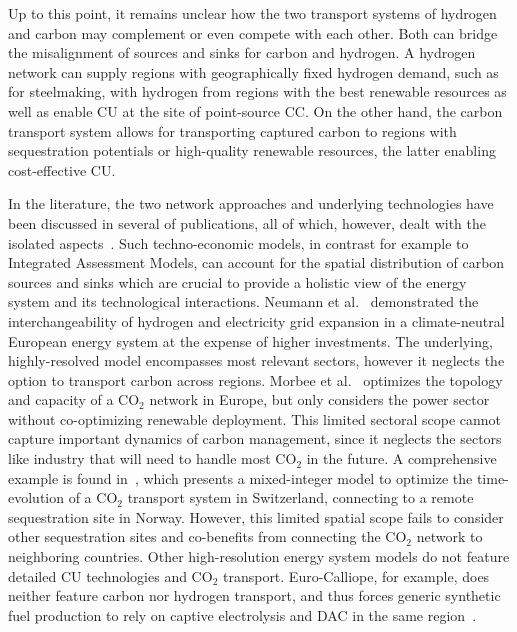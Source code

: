 \documentclass[twocolumn]{article}
\newcommand{\COtwo}{CO$_2$}
\begin{document}
Up to this point, it remains unclear how the two transport systems of hydrogen and carbon may complement or even compete with each other. Both can bridge the misalignment of sources and sinks for carbon and hydrogen. A hydrogen network can supply regions with geographically fixed hydrogen demand, such as for steelmaking, with hydrogen from regions with the best renewable resources as well as enable CU at the site of point-source CC. On the other hand, the carbon transport system allows for transporting captured carbon to regions with sequestration potentials or high-quality renewable resources, the latter enabling cost-effective CU.

In the literature, the two network approaches and underlying technologies have been discussed in several of publications, all of which, however, dealt with the isolated aspects~\cite{bakkenLinearModelsOptimization2008,morbeeOptimisedDeploymentEuropean2012,stewartFeasibilityEuropeanwideIntegrated2014,oeiModelingCarbonCapture2014,elahiMultiperiodLeastCost2014,burandtDecarbonizingChinaEnergy2019,middletonSimCCSOpensourceTool2020,bjerketvedtOptimalDesignCost2020,weiProposedGlobalLayout2021,damoreOptimalDesignEuropean2021,becattiniCarbonDioxideCapture2022,neumannBenefitsHydrogenNetwork2022}. Such techno-economic models, in contrast for example to Integrated Assessment Models, can account for the spatial distribution of carbon sources and sinks which are crucial to provide a holistic view of the energy system and its technological interactions. Neumann et al.~\cite{neumannBenefitsHydrogenNetwork2022} demonstrated the interchangeability of hydrogen and electricity grid expansion in a climate-neutral European energy system at the expense of higher investments. The underlying, highly-resolved model encompasses most relevant sectors, however it neglects the option to transport carbon across regions.
Morbee et al.~\cite{morbeeOptimisedDeploymentEuropean2012} optimizes the topology and capacity of a \COtwo{} network in Europe, but only considers the power sector without co-optimizing renewable deployment. This limited sectoral scope cannot capture important dynamics of carbon management, since it neglects the sectors like industry that will need to handle most \COtwo{} in the future.
A comprehensive example is found in~\cite{becattiniCarbonDioxideCapture2022}, which presents a mixed-integer model to optimize the time-evolution of a \COtwo{} transport system in Switzerland, connecting to a remote sequestration site in Norway. However, this limited spatial scope fails to consider other sequestration sites and co-benefits from connecting the \COtwo{} network to neighboring countries.
Other high-resolution energy system models do not feature detailed CU technologies and \COtwo{} transport. Euro-Calliope, for example, does neither feature carbon nor hydrogen transport, and thus forces generic synthetic fuel production to rely on captive electrolysis and DAC in the same region~\cite{pickeringDiversityOptionsEliminate2022}.
\end{document}
